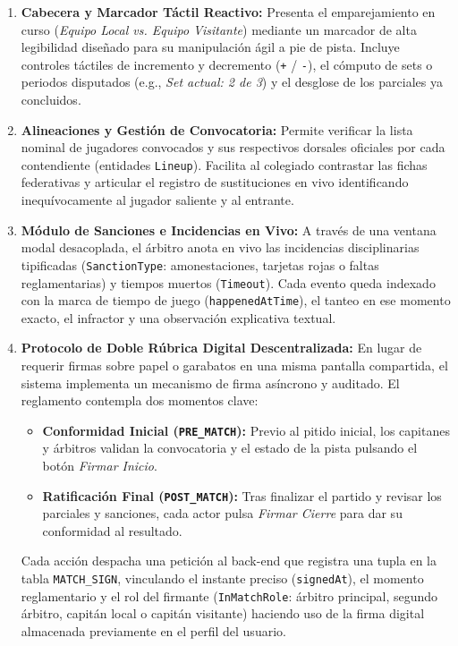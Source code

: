 \begin{enumerate}
    \item \textbf{Cabecera y Marcador Táctil Reactivo:} 
    Presenta el emparejamiento en curso (\textit{Equipo Local vs. Equipo Visitante}) mediante un marcador de alta legibilidad diseñado para su manipulación ágil a pie de pista. Incluye controles táctiles de incremento y decremento (\texttt{+} / \texttt{-}), el cómputo de sets o periodos disputados (e.g., \textit{Set actual: 2 de 3}) y el desglose de los parciales ya concluidos.
    \item \textbf{Alineaciones y Gestión de Convocatoria:} Permite verificar la lista nominal de jugadores convocados y sus respectivos dorsales oficiales por cada contendiente (entidades \texttt{Lineup}). Facilita al colegiado contrastar las fichas federativas y articular el registro de sustituciones en vivo identificando inequívocamente al jugador saliente y al entrante.
    \item \textbf{Módulo de Sanciones e Incidencias en Vivo:} A través de una ventana modal desacoplada, el árbitro anota en vivo las incidencias disciplinarias tipificadas (\texttt{SanctionType}: amonestaciones, tarjetas rojas o faltas reglamentarias) y tiempos muertos (\texttt{Timeout}). Cada evento queda indexado con la marca de tiempo de juego (\texttt{happenedAtTime}), el tanteo en ese momento exacto, el infractor y una observación explicativa textual.

    \item \textbf{Protocolo de Doble Rúbrica Digital Descentralizada:} En lugar de requerir firmas sobre papel o garabatos en una misma pantalla compartida, el sistema implementa un mecanismo de firma asíncrono y auditado. El reglamento contempla dos momentos clave:
    \begin{itemize}
        \item \textbf{Conformidad Inicial (\texttt{PRE\_MATCH}):} Previo al pitido inicial, los capitanes y árbitros validan la convocatoria y el estado de la pista pulsando el botón \textit{Firmar Inicio}.
        \item \textbf{Ratificación Final (\texttt{POST\_MATCH}):} Tras finalizar el partido y revisar los parciales y sanciones, cada actor pulsa \textit{Firmar Cierre} para dar su conformidad al resultado.
    \end{itemize}
    Cada acción despacha una petición al back-end que registra una tupla en la tabla \texttt{MATCH\_SIGN}, vinculando el instante preciso (\texttt{signedAt}), el momento reglamentario y el rol del firmante (\texttt{InMatchRole}: árbitro principal, segundo árbitro, capitán local o capitán visitante) haciendo uso de la firma digital almacenada previamente en el perfil del usuario.
\end{enumerate}

